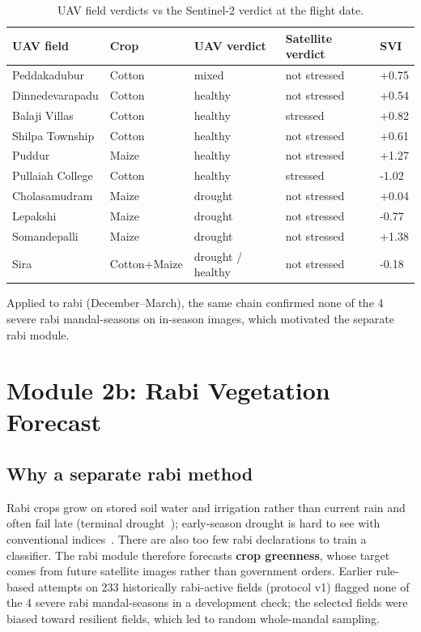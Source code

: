 \documentclass[11pt,a4paper,oneside]{article}
\begin{document}
\begin{table}[H]
\centering
\caption{UAV field verdicts vs the Sentinel-2 verdict at the flight date.}
\label{tab:s_uav}
\footnotesize
\begin{tabular}{@{}lllll@{}}
\toprule
\textbf{UAV field} & \textbf{Crop} & \textbf{UAV verdict} & \textbf{Satellite verdict} & \textbf{SVI} \\
\midrule
Peddakadubur & Cotton & mixed & not stressed & +0.75 \\
Dinnedevarapadu & Cotton & healthy & not stressed & +0.54 \\
Balaji Villas & Cotton & healthy & stressed & +0.82 \\
Shilpa Township & Cotton & healthy & not stressed & +0.61 \\
Puddur & Maize & healthy & not stressed & +1.27 \\
Pullaiah College & Cotton & healthy & stressed & -1.02 \\
Cholasamudram & Maize & drought & not stressed & +0.04 \\
Lepakshi & Maize & drought & not stressed & -0.77 \\
Somandepalli & Maize & drought & not stressed & +1.38 \\
Sira & Cotton+Maize & drought  / healthy & not stressed & -0.18 \\
\bottomrule
\end{tabular}
\end{table}


Applied to rabi (December--March), the same chain confirmed none of the 4 severe rabi mandal-seasons on in-season images, which motivated the separate rabi module.

\section{Module 2b: Rabi Vegetation Forecast}

\subsection{Why a separate rabi method}
Rabi crops grow on stored soil water and irrigation rather than current rain and often fail late (terminal drought~\cite{pang2017}); early-season drought is hard to see with conventional indices~\cite{nikam2020}. There are also too few rabi declarations to train a classifier. The rabi module therefore forecasts \textbf{crop greenness}, whose target comes from future satellite images rather than government orders. Earlier rule-based attempts on 233 historically rabi-active fields (protocol v1) flagged none of the 4 severe rabi mandal-seasons in a development check; the selected fields were biased toward resilient fields, which led to random whole-mandal sampling.
\end{document}
